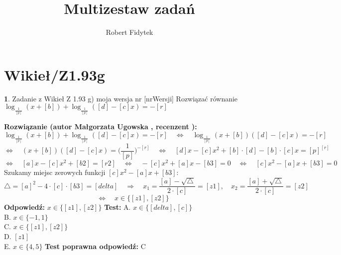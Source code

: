 \documentclass[12pt, a4paper]{article}
\title{Multizestaw zadań}
\author{Robert Fidytek}
\date{}
\theoremstyle{definition} %
\newtheorem{zad}{}
\newcommand{\kategoria}[1]{\section{#1}} %
\newcommand{\zadStart}[1]{\begin{zad}#1\newline} %
\newcommand{\zadStop}{\end{zad}}   %
\newcommand{\rozwStart}[2]{\noindent \textbf{Rozwiązanie (autor #1 , recenzent #2): }\newline} %
\newcommand{\rozwStop}{\newline}                                            %
\newcommand{\odpStart}{\noindent \textbf{Odpowiedź:}\newline}    %
\newcommand{\odpStop}{\newline}                                             %
\newcommand{\testStart}{\noindent \textbf{Test:}\newline} %
\newcommand{\testStop}{\newline} %
\newcommand{\kluczStart}{\noindent \textbf{Test poprawna odpowiedź:}\newline} %
\newcommand{\kluczStop}{\newline} %
\begin{document}
\maketitle


\kategoria{Wikieł/Z1.93g}
\zadStart{Zadanie z Wikieł Z 1.93 g) moja wersja nr [nrWersji]}
Rozwiązać równanie $\log_{\frac{1}{[p]}}{(x+[b])} + \log_{\frac{1}{[p]}}{([d]-[c]x)} = -[r]$
\zadStop
\rozwStart{Małgorzata Ugowska}{}
$$\log_{\frac{1}{[p]}}{(x+[b])} + \log_{\frac{1}{[p]}}{([d]-[c]x)} = -[r] \quad \Longleftrightarrow \quad \log_{\frac{1}{[p]}}{(x+[b])([d]-[c]x)}= -[r]$$
$$\Longleftrightarrow \quad (x+[b])([d]-[c]x)= \Big(\frac{1}{[p]}\Big)^{-[r]} \quad \Longleftrightarrow \quad [d]x-[c]x^2+[b] \cdot [d]-[b] \cdot [c]x= [p]^{[r]} $$
$$\Longleftrightarrow \quad [a]x-[c]x^2+[b2]= [r2] \quad \Longleftrightarrow \quad -[c]x^2+[a]x-[b3]= 0 \quad \Longleftrightarrow \quad [c]x^2-[a]x+[b3]= 0$$
Szukamy miejsc zerowych funkcji $[c]x^2-[a]x+[b3]$:
$$ \bigtriangleup = [a]^2-4 \cdot [c] \cdot [b3] = [delta] \quad  \Longrightarrow \quad x_1=\frac{[a]-\sqrt{\bigtriangleup}}{2\cdot [c]} = [z1], \quad x_2=\frac{[a]+\sqrt{\bigtriangleup}}{2\cdot [c]} = [z2]$$
$$ \quad \Longleftrightarrow \quad x \in \{[z1],[z2]\}$$
\rozwStop
\odpStart
$x \in \{[z1],[z2]\}$
\odpStop
\testStart
A. $x \in \{[delta],[c]\}$\\
B. $x \in \{-1,1\}$\\
C. $x \in \{[z1],[z2]\}$\\
D. $[z1]$\\
E. $x \in \{4,5\}$
\testStop
\kluczStart
C
\kluczStop
\end{document}
